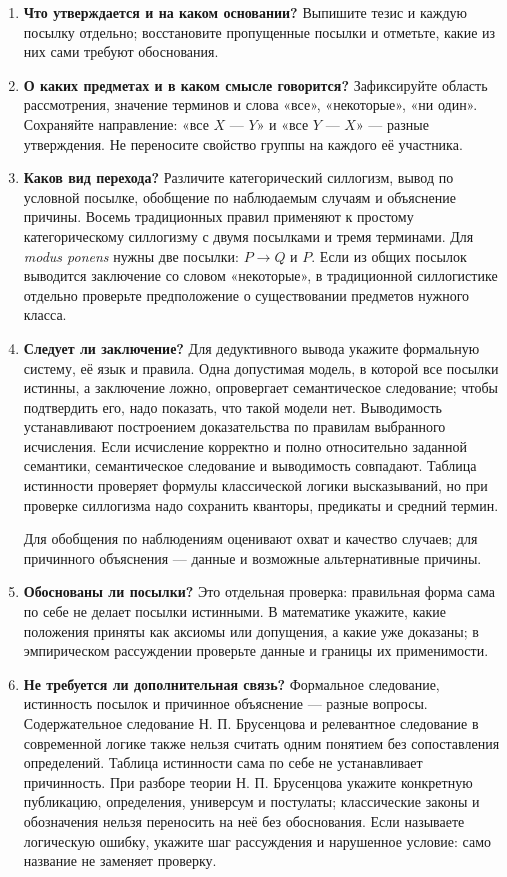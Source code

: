 \documentclass[12pt,a4paper]{article}
\begin{document}
\begin{enumerate}
\item \textbf{Что утверждается и на каком основании?} Выпишите тезис и каждую посылку отдельно; восстановите пропущенные посылки и отметьте, какие из них сами требуют обоснования.
\item \textbf{О каких предметах и в каком смысле говорится?} Зафиксируйте область рассмотрения, значение терминов и слова «все», «некоторые», «ни один». Сохраняйте направление: «все \(X\) — \(Y\)» и «все \(Y\) — \(X\)» — разные утверждения. Не переносите свойство группы на каждого её участника.
\item \textbf{Каков вид перехода?} Различите категорический силлогизм, вывод по условной посылке, обобщение по наблюдаемым случаям и объяснение причины. Восемь традиционных правил применяют к простому категорическому силлогизму с двумя посылками и тремя терминами. Для \emph{modus ponens} нужны две посылки: \(P\to Q\) и \(P\). Если из общих посылок выводится заключение со словом «некоторые», в традиционной силлогистике отдельно проверьте предположение о существовании предметов нужного класса.
\item \textbf{Следует ли заключение?} Для дедуктивного вывода укажите формальную систему, её язык и правила. Одна допустимая модель, в которой все посылки истинны, а заключение ложно, опровергает семантическое следование; чтобы подтвердить его, надо показать, что такой модели нет. Выводимость устанавливают построением доказательства по правилам выбранного исчисления. Если исчисление корректно и полно относительно заданной семантики, семантическое следование и выводимость совпадают. Таблица истинности проверяет формулы классической логики высказываний, но при проверке силлогизма надо сохранить кванторы, предикаты и средний термин.

Для обобщения по наблюдениям оценивают охват и качество случаев; для причинного объяснения — данные и возможные альтернативные причины.
\item \textbf{Обоснованы ли посылки?} Это отдельная проверка: правильная форма сама по себе не делает посылки истинными. В математике укажите, какие положения приняты как аксиомы или допущения, а какие уже доказаны; в эмпирическом рассуждении проверьте данные и границы их применимости.
\item \textbf{Не требуется ли дополнительная связь?} Формальное следование, истинность посылок и причинное объяснение — разные вопросы. Содержательное следование Н. П. Брусенцова и релевантное следование в современной логике также нельзя считать одним понятием без сопоставления определений. Таблица истинности сама по себе не устанавливает причинность. При разборе теории Н. П. Брусенцова укажите конкретную публикацию, определения, универсум и постулаты; классические законы и обозначения нельзя переносить на неё без обоснования. Если называете логическую ошибку, укажите шаг рассуждения и нарушенное условие: само название не заменяет проверку.
\end{enumerate}
\end{document}
